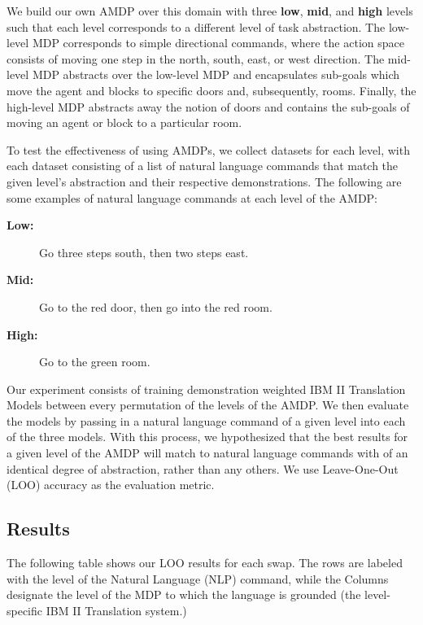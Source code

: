 \documentclass[conference]{IEEEtran}
\begin{document}
We build our own AMDP over this domain with three \textbf{low}, \textbf{mid}, and \textbf{high} levels such that each level corresponds to a different level of task abstraction. The low-level MDP corresponds to simple directional commands, where the action space consists of moving one step in the north, south, east, or west direction. The mid-level MDP abstracts over the low-level MDP and encapsulates sub-goals which move the agent and blocks to specific doors and, subsequently, rooms. Finally, the high-level MDP abstracts away the notion of doors and contains the sub-goals of moving an agent or block to a particular room.

To test the effectiveness of using AMDPs, we collect datasets for each level, with each dataset consisting of a list of natural language commands that match the given level's abstraction and their respective demonstrations. The following are some examples of natural language commands at each level of the AMDP:

\begin{description}
\item[\textbf{Low:}] Go three steps south, then two steps east.
\item[\textbf{Mid:}] Go to the red door, then go into the red room.
\item[\textbf{High:}] Go to the green room.
\end{description}

Our experiment consists of training demonstration weighted IBM II Translation Models between every permutation of the levels of the AMDP. We then evaluate the models by passing in a natural language command of a given level into each of the three models. With this process, we hypothesized that the best results for a given level of the AMDP will match to natural language commands with of an identical degree of abstraction, rather than any others. We use Leave-One-Out (LOO) accuracy as the evaluation metric.

\subsection{Results}

The following table shows our LOO results for each swap. The rows are labeled with the level of the Natural Language (NLP) command, while the Columns designate the level of the MDP to which the language is grounded (the level-specific IBM II Translation system.)
\end{document}
